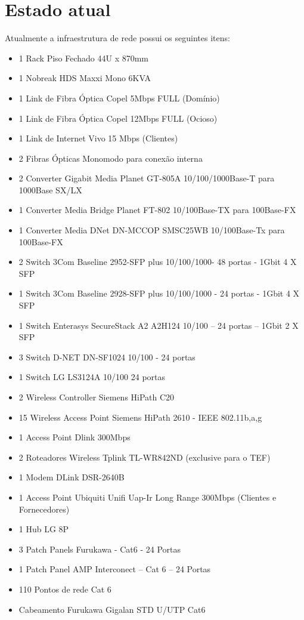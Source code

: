 \documentclass[	DIV=calc,%
							paper=a4,%
							fontsize=12pt,%
							onecolumn]{scrartcl}	 					%
\begin{document}
\section{Estado atual}
Atualmente a infraestrutura de rede possui os seguintes itens:

\begin{itemize}
	\item 1 Rack Piso Fechado 44U x 870mm
	\item 1 Nobreak HDS Maxxi Mono 6KVA
	\item 1 Link de Fibra Óptica Copel 5Mbps FULL (Domínio)
	\item 1 Link de Fibra Óptica Copel 12Mbps FULL (Ocioso)
	\item 1 Link de Internet Vivo 15 Mbps (Clientes)
	\item 2 Fibras Ópticas Monomodo para conexão interna
	\item 2 Converter Gigabit Media Planet GT-805A 10/100/1000Base-T para 1000Base SX/LX
	\item 1 Converter Media Bridge Planet FT-802 10/100Base-TX para 100Base-FX 
	\item 1 Converter Media DNet DN-MCCOP SMSC25WB 10/100Base-Tx para 100Base-FX
	\item 2 Switch 3Com Baseline 2952-SFP plus  10/100/1000- 48 portas - 1Gbit 4 X SFP
	\item 1 Switch 3Com Baseline 2928-SFP plus 10/100/1000 - 24 portas - 1Gbit 4 X SFP
	\item 1 Switch Enterasys SecureStack A2 A2H124 10/100 – 24 portas – 1Gbit 2 X SFP
	\item 3 Switch D-NET DN-SF1024 10/100 - 24 portas 
	\item 1 Switch LG LS3124A 10/100 24 portas 
	\item 2 Wireless Controller Siemens HiPath C20
	\item 15 Wireless Access Point  Siemens HiPath 2610 - IEEE 802.11b,a,g
	\item 1 Access Point Dlink 300Mbps
	\item 2 Roteadores Wireless Tplink TL-WR842ND (exclusive para o TEF) 
	\item 1 Modem DLink DSR-2640B
	\item 1 Access Point Ubiquiti Unifi Uap-Ir Long Range 300Mbps (Clientes e Fornecedores) 
	\item 1 Hub LG 8P
	\item 3 Patch Panels Furukawa - Cat6 - 24 Portas
	\item 1 Patch Panel AMP Interconect – Cat 6 – 24 Portas
	\item 110 Pontos de rede Cat 6
	\item Cabeamento Furukawa Gigalan STD U/UTP Cat6
\end{itemize}
\end{document}
